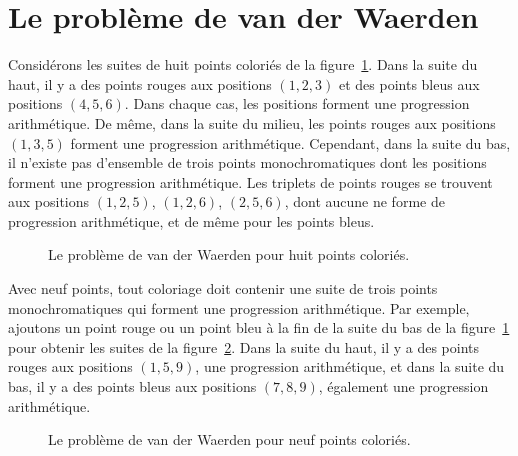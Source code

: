 
\section{Le problème de van der Waerden}\label{s.van}

Considérons les suites de huit points coloriés de la figure~\ref{f.vdw1}. Dans la suite du haut, il y a des points rouges aux positions $(1,2,3)$ et des points bleus aux positions $(4,5,6)$. Dans chaque cas, les positions forment une progression arithmétique. De même, dans la suite du milieu, les points rouges aux positions $(1,3,5)$ forment une progression arithmétique. Cependant, dans la suite du bas, il n'existe pas d'ensemble de trois points monochromatiques dont les positions forment une progression arithmétique. 
Les triplets de points rouges se trouvent aux positions $(1,2,5)$, $(1,2,6)$, $(2,5,6)$, dont aucune ne forme de progression arithmétique, et de même pour les points bleus.

\begin{figure}[htb]
\centering
{}
\caption{Le problème de van der Waerden pour huit points coloriés.}\label{f.vdw1}
\end{figure}

Avec neuf points, tout coloriage doit contenir une suite de trois points monochromatiques qui forment une progression arithmétique. Par exemple, ajoutons un point rouge ou un point bleu à la fin de la suite du bas de la figure~\ref{f.vdw1} pour obtenir les suites de la figure~\ref{f.vdw2}. Dans la suite du haut, il y a des points rouges aux positions $(1,5,9)$, une progression arithmétique, et dans la suite du bas, il y a des points bleus aux positions $(7,8,9)$, également une progression arithmétique.

\begin{figure}[htb]
\centering
{}
\caption{Le problème de van der Waerden pour neuf points coloriés.}\label{f.vdw2}
\end{figure}


